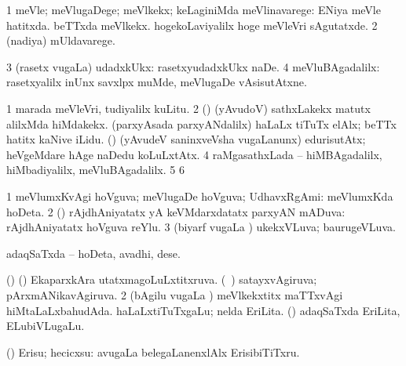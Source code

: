 {{\bentry 
{} 
\gl{\upa}
\bmng
\bnum
\num{1} meVle; meVlugaDege; meVlkekx; keLaginiMda meVlinavarege:  ENiya meVle hatitxda.  beTTxda meVlkekx.  hogekoLaviyalilx hoge meVleVri sAgutatxde. 
\num{2} (nadiya) mUldavarege. 
\num{3} (rasetx \mo vugaLa) udadxkUkx:  rasetxyudadxkUkx naDe. 
\num{4} meVluBAgadalilx:  rasetxyalilx inUnx savxlpx muMde, meVlugaDe vAsisutAtxne. 
\enum
\emng

\noindent
\gl{\pagu}
\expl{}
\bmng
\bnum
\num{1}  marada meVleVri, tudiyalilx kuLitu. 
\num{2}  (\rUpa) (yAvudoV) sathxLakekx matutx alilxMda hiMdakekx. 
  
\banum
{} (parxyAsada parxyANdalilx) haLaLx tiTuTx elAlx; beTTx hatitx kaNive iLidu. 
 (\rUpa) (yAvudeV saninxveVsha \mo vugaLanunx) edurisutAtx; heVgeMdare hAge naDedu koLuLxtAtx. 
\eanum
\numie
\num{4}  raMgasathxLada -- hiMBAgadalilx, hiMbadiyalilx, meVluBAgadalilx. 
\num{5}  
\num{6}  
\enum
\emng
\eentry

\bentry
{} 
\gl{\gu}
\expl{}
\bmng
\bnum
\num{1} meVlumxKvAgi hoVguva; meVlugaDe hoVguva; UdhavxRgAmi:  meVlumxKda hoDeta. 
\num{2} (\birx) rAjdhAniyatatx yA keVMdarxdatatx parxyAN mADuva:  rAjdhAniyatatx hoVguva reYlu. 
\num{3} (biyarf \mo vugaLa \vi) ukekxVLuva; baurugeVLuva. 
\enum
\emng
\eentry

\bentry
{} 
\gl{\nA}
\expl{}
\bmng
adaqSaTxda -- hoDeta, avadhi, dese. 
\emng

\noindent
\gl{\pagu}
\expl{}
\bmng
\bnum
{}  (\AmA) 
\banum
{} (\birx) EkaparxkAra utatxmagoLuLxtitxruva. 
 (\kanmu\ \ame) satayxvAgiruva; pArxmANikavAgiruva. 
\eanum
\numie
\num{2}  (bAgilu \mo vugaLa \vi) meVlkekxtitx maTTxvAgi hiMtaLaLxbahudAda. 
  
\banum
{} haLaLxtiTuTxgaLu; nelda EriLita. 
 (\rUpa) adaqSaTxda EriLita, ELubiVLugaLu. 
\eanum
\numie
\enum
\emng
\eentry

\bentry
{} 
\gl{\kirx}


\noindent
\gl{\sakirx}
\expl{}
\bmng
(\AmA) Erisu; hecicxsu:  avugaLa belegaLanenxlAlx ErisibiTiTxru. 
\emng

}}
